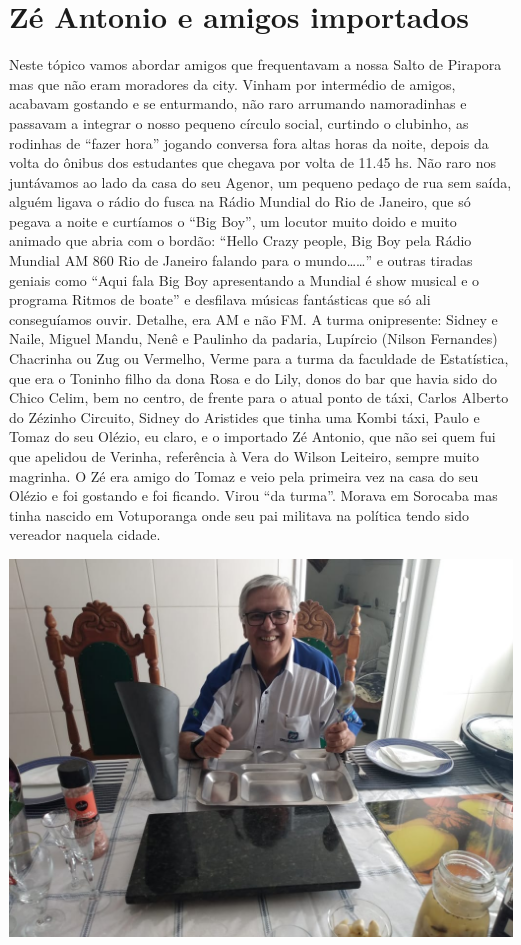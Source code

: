 \documentclass[12pt,brazil,]{book}
\begin{document}
\section{Zé Antonio e amigos
importados}\label{zuxe9-antonio-e-amigos-importados}

Neste tópico vamos abordar amigos que frequentavam a nossa Salto de
Pirapora mas que não eram moradores da city. Vinham por intermédio de
amigos, acabavam gostando e se enturmando, não raro arrumando
namoradinhas e passavam a integrar o nosso pequeno círculo social,
curtindo o clubinho, as rodinhas de ``fazer hora'' jogando conversa fora
altas horas da noite, depois da volta do ônibus dos estudantes que
chegava por volta de 11.45 hs. Não raro nos juntávamos ao lado da casa
do seu Agenor, um pequeno pedaço de rua sem saída, alguém ligava o rádio
do fusca na Rádio Mundial do Rio de Janeiro, que só pegava a noite e
curtíamos o ``Big Boy'', um locutor muito doido e muito animado que
abria com o bordão: ``Hello Crazy people, Big Boy pela Rádio Mundial AM
860 Rio de Janeiro falando para o mundo\ldots{}\ldots{}'' e outras
tiradas geniais como ``Aqui fala Big Boy apresentando a Mundial é show
musical e o programa Ritmos de boate'' e desfilava músicas fantásticas
que só ali conseguíamos ouvir. Detalhe, era AM e não FM. A turma
onipresente: Sidney e Naile, Miguel Mandu, Nenê e Paulinho da padaria,
Lupírcio (Nilson Fernandes) Chacrinha ou Zug ou Vermelho, Verme para a
turma da faculdade de Estatística, que era o Toninho filho da dona Rosa
e do Lily, donos do bar que havia sido do Chico Celim, bem no centro, de
frente para o atual ponto de táxi, Carlos Alberto do Zézinho Circuito,
Sidney do Aristides que tinha uma Kombi táxi, Paulo e Tomaz do seu
Olézio, eu claro, e o importado Zé Antonio, que não sei quem fui que
apelidou de Verinha, referência à Vera do Wilson Leiteiro, sempre muito
magrinha. O Zé era amigo do Tomaz e veio pela primeira vez na casa do
seu Olézio e foi gostando e foi ficando. Virou ``da turma''. Morava em
Sorocaba mas tinha nascido em Votuporanga onde seu pai militava na
política tendo sido vereador naquela cidade.

\includegraphics{Imagens/ZeAntonio.jpeg}
\end{document}
